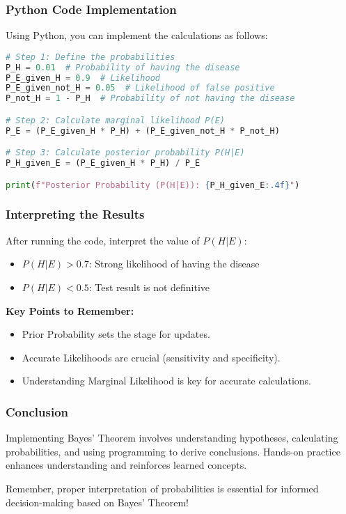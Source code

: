 \documentclass[aspectratio=169]{beamer}
\begin{document}
\begin{frame}[fragile]
    \frametitle{Python Code Implementation}
    Using Python, you can implement the calculations as follows:
    
    \begin{lstlisting}[language=Python]
# Step 1: Define the probabilities
P_H = 0.01  # Probability of having the disease
P_E_given_H = 0.9  # Likelihood
P_E_given_not_H = 0.05  # Likelihood of false positive
P_not_H = 1 - P_H  # Probability of not having the disease

# Step 2: Calculate marginal likelihood P(E)
P_E = (P_E_given_H * P_H) + (P_E_given_not_H * P_not_H)

# Step 3: Calculate posterior probability P(H|E)
P_H_given_E = (P_E_given_H * P_H) / P_E

print(f"Posterior Probability (P(H|E)): {P_H_given_E:.4f}")
    \end{lstlisting}
\end{frame}

\begin{frame}
    \frametitle{Interpreting the Results}
    After running the code, interpret the value of \( P(H|E) \):
    \begin{itemize}
        \item \( P(H|E) > 0.7 \): Strong likelihood of having the disease
        \item \( P(H|E) < 0.5 \): Test result is not definitive
    \end{itemize}

    \textbf{Key Points to Remember:}
    \begin{itemize}
        \item Prior Probability sets the stage for updates.
        \item Accurate Likelihoods are crucial (sensitivity and specificity).
        \item Understanding Marginal Likelihood is key for accurate calculations.
    \end{itemize}
\end{frame}

\begin{frame}
    \frametitle{Conclusion}
    Implementing Bayes' Theorem involves understanding hypotheses, calculating probabilities, and using programming to derive conclusions. Hands-on practice enhances understanding and reinforces learned concepts.

    Remember, proper interpretation of probabilities is essential for informed decision-making based on Bayes' Theorem!
\end{frame}
\end{document}
